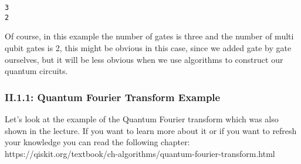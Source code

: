 \documentclass[11pt]{article}
\begin{document}
    \begin{Verbatim}[commandchars=\\\{\}]
3
2
    \end{Verbatim}

    Of course, in this example the number of gates is three and the number
of multi qubit gates is 2, this might be obvious in this case, since we
added gate by gate ourselves, but it will be less obvious when we use
algorithms to construct our quantum circuits.

    \hypertarget{ii.1.1-quantum-fourier-transform-example}{%
\subsubsection{II.1.1: Quantum Fourier Transform
Example}\label{ii.1.1-quantum-fourier-transform-example}}

Let's look at the example of the Quantum Fourier transform which was
also shown in the lecture. If you want to learn more about it or if you
want to refresh your knowledge you can read the following chapter:
https://qiskit.org/textbook/ch-algorithms/quantum-fourier-transform.html
\end{document}
